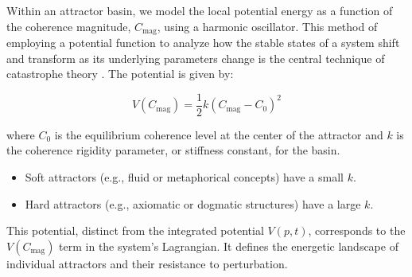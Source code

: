 Within an attractor basin, we model the local potential energy as a function of the coherence magnitude, \(C_{\text{mag}}\), using a harmonic oscillator. This method of employing a potential function to analyze how the stable states of a system shift and transform as its underlying parameters change is the central technique of catastrophe theory \autocite{Thom1975}. The potential is given by:

\begin{equation}\label{eq:attractor_potential}
V(C_{\text{mag}}) = \frac{1}{2}k(C_{\text{mag}} - C_0)^2
\end{equation}

where \(C_0\) is the equilibrium coherence level at the center of the attractor and \(k\) is the coherence rigidity parameter, or stiffness constant, for the basin.

\begin{itemize}

    \item Soft attractors (e.g., fluid or metaphorical concepts) have a small \(k\).
    
    \item Hard attractors (e.g., axiomatic or dogmatic structures) have a large \(k\).

\end{itemize}

This potential, distinct from the integrated potential \(V(p,t)\), corresponds to the \(V(C_{\text{mag}})\) term in the system's Lagrangian. It defines the energetic landscape of individual attractors and their resistance to perturbation. 